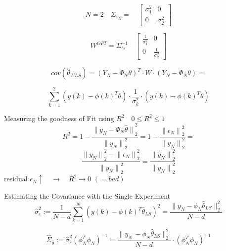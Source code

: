 \begin{equation*}
N=2 \quad { \Sigma  }_{ { \varepsilon  }_{ N } }=\quad \begin{bmatrix} \sigma _{ 1 }^{ 2 } & 0 \\ 0 & \sigma _{ 2 }^{ 2 } \end{bmatrix}
\end{equation*}

\begin{equation*}
W^{ OPT } = \Sigma _{ ^{ \varepsilon_{ N } } }^{ -1 }\quad \begin{bmatrix} \frac { 1 }{ \sigma _{ 1 }^{ 2 } }  & 0 \\ 0 & \frac { 1 }{ \sigma _{ 2 }^{ 2 } }  \end{bmatrix}
\end{equation*}

\begin{equation*}
cov({ \hat { \theta  } _{ WLS } }){ =({ Y }_{ N }-{ \Phi  }_{ N }\theta ) }^{ T }\cdot W\cdot ({ Y }_{ N }-{ \Phi  }_{ N }\theta )=
\end{equation*}

\begin{equation*}
\sum _{ k=1 }^{ 2 }{ (y(k)-{ \phi (k) }^{ T }\theta )\cdot \frac { 1 }{ { \sigma  }_{ k }^{ 2 } } \cdot (y(k)-{ \phi (k) }^{ T }\theta ) } 
\end{equation*}


Measuring the goodness of Fit using \({R}^{2} \quad 0\le {R}^{2} \le1\) 
\begin{equation*}
{ R }^{ 2 }=1-\frac { { \parallel { y }_{ N }-{ \Phi  }_{ N }\hat { \theta  } \parallel  }_{ 2 }^{ 2 } }{ { \parallel { y }_{ N }\parallel  }_{ 2 }^{ 2 } } =1-\frac { { \parallel { \epsilon  }_{ N }\parallel  }_{ 2 }^{ 2 } }{ { \parallel { y }_{ N }\parallel  }_{ 2 }^{ 2 } } =
\end{equation*}
\begin{equation*}
\frac { { \parallel { y }_{ N }\parallel  }_{ 2 }^{ 2 }-{ \parallel { \epsilon  }_{ N }\parallel  }_{ 2 }^{ 2 } }{ { \parallel { y }_{ N }\parallel  }_{ 2 }^{ 2 } } =\frac { { \parallel { \hat { y  }  }_{ N }\parallel  }_{ 2 }^{ 2 } }{ { \parallel { y }_{ N }\parallel  }_{ 2 }^{ 2 } } 
\end{equation*}
residual $ \epsilon_{N} \uparrow \quad \rightarrow \quad R^{2} \rightarrow 0 \,\,(= bad)$





Estimating the Covariance with the Single Experiment
\begin{equation*}
\hat { \sigma  } _{ \varepsilon  }^{ 2 } := \frac { 1 }{ N-d } \sum _{ k=1 }^{ N }{ (y(k)-\phi (k)^{ T }\hat { \theta  } _{ LS })^{ 2 } }  = \frac { \parallel y_{ N }-\phi _{ N }\hat { \theta  } _{ LS }{ \parallel  }_{ 2 }^{ 2 } }{ N-d } 
\end{equation*}

\begin{equation*}
\hat { \Sigma  } _{ \hat { \theta  }  } := \hat { \sigma  } ^{ 2 }_{ \varepsilon  } (\phi ^{ T }_{ N } \phi _{ N })^{ -1 } = \frac { \parallel y_{ N }\, -\phi _{ N }\hat { \theta  } _{ LS }{ \parallel  }_{ 2 }^{ 2 } }{ N-d } \cdot (\phi ^{ T }_{ N } \phi _{ N })^{ -1 }
\end{equation*}
